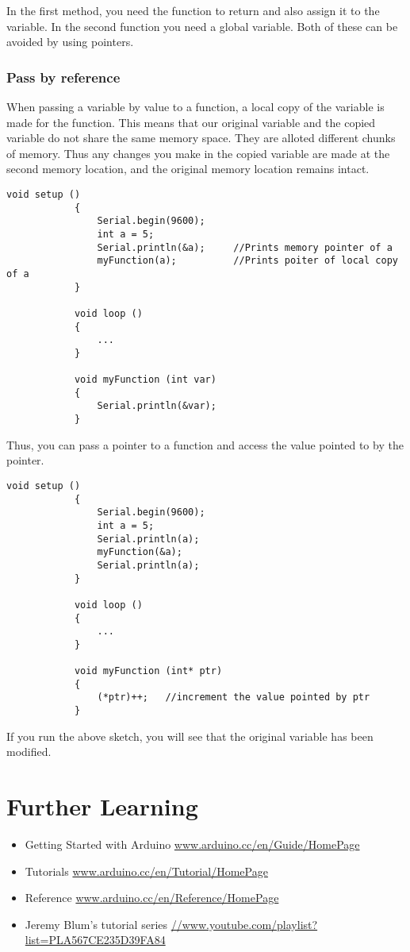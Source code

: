 \documentclass{article}
\begin{document}
			In the first method, you need the function to return and also assign it to the variable. In the second function you need a global variable. Both of these can be avoided by using pointers.

		\subsubsection{Pass by reference}

			When passing a variable by value to a function, a local copy of the variable is made for the function. This means that our original variable and the copied variable do not share the same memory space. They are alloted different chunks of memory. Thus any changes you make in the copied variable are made at the second memory location, and the original memory location remains intact.

			\begin{lstlisting}[gobble=12]
			void setup ()
			{
				Serial.begin(9600);
				int a = 5;
				Serial.println(&a);		//Prints memory pointer of a
				myFunction(a);			//Prints poiter of local copy of a
			}

			void loop ()
			{
				...
			}

			void myFunction (int var)
			{
				Serial.println(&var);
			}
			\end{lstlisting}

			Thus, you can pass a pointer to a function and access the value pointed to by the pointer.

			\begin{lstlisting}[gobble=12]
			void setup ()
			{
				Serial.begin(9600);
				int a = 5;
				Serial.println(a);
				myFunction(&a);
				Serial.println(a);
			}

			void loop ()
			{
				...
			}

			void myFunction (int* ptr)
			{
				(*ptr)++;	//increment the value pointed by ptr
			}
			\end{lstlisting}

			If you run the above sketch, you will see that the original variable  has been modified.

\section{Further Learning}

	\begin{itemize}
		\item Getting Started with Arduino \url{www.arduino.cc/en/Guide/HomePage}
		\item Tutorials \url{www.arduino.cc/en/Tutorial/HomePage}
		\item Reference \url{www.arduino.cc/en/Reference/HomePage}
		\item Jeremy Blum's tutorial series \url{//www.youtube.com/playlist?list=PLA567CE235D39FA84}
	\end{itemize}
\end{document}
